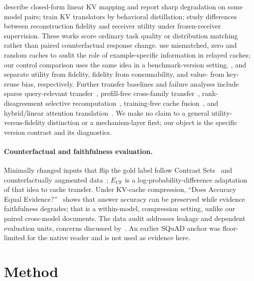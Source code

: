 \documentclass[11pt,a4paper]{article}
\begin{document}
\citeauthor{heo2026} describe closed-form linear KV mapping and report sharp
degradation on some model pairs; \citeauthor{kvlingo} train KV translators by
behavioral distillation; \citeauthor{cachelink} study differences between
reconstruction fidelity and receiver utility under frozen-receiver supervision.
These works score ordinary task quality or distribution matching rather than
paired counterfactual response change. \citeauthor{cheng2026} use mismatched,
zero and random caches to audit the role of example-specific information in
relayed caches; our control comparison uses the same idea in a benchmark-version
setting. \citeauthor{tao2026}, \citeauthor{deng2026} and \citeauthor{lin2026}
separate utility from fidelity, fidelity from consumability, and value- from
key-reuse bias, respectively. Further transfer baselines and failure analyses
include sparse query-relevant transfer~\cite{liu2026acct}, prefill-free
cross-family transfer~\cite{alabdulkareem2026}, rank-disagreement selective
recomputation~\cite{sarkar2026}, training-free cache
fusion~\cite{khare2026}, and hybrid/linear attention
translation~\cite{kvedaras2026,behnam2026}. We make no claim to a general
utility-versus-fidelity distinction or a mechanism-layer first; our object is
the specific version contrast and its diagnostics.

\paragraph{Counterfactual and faithfulness evaluation.}

Minimally changed inputs that flip the gold label follow Contrast
Sets~\cite{contrastsets} and counterfactually augmented data~\cite{kaushik2020};
$E_{\mathrm{CF}}$ is a log-probability-difference adaptation of that idea to
cache transfer. Under KV-cache compression,
``Does Accuracy Equal Evidence?''~\cite{acc_evidence} shows that answer
accuracy can be preserved while evidence faithfulness degrades; that is a
within-model, compression setting, unlike our paired cross-model documents.
The data audit addresses leakage and dependent evaluation units, concerns
discussed by~\citeauthor{kapoor2023}. An earlier SQuAD anchor was floor-limited
for the native reader and is not used as evidence here.

\section{Method}
\label{sec:method}
\end{document}
